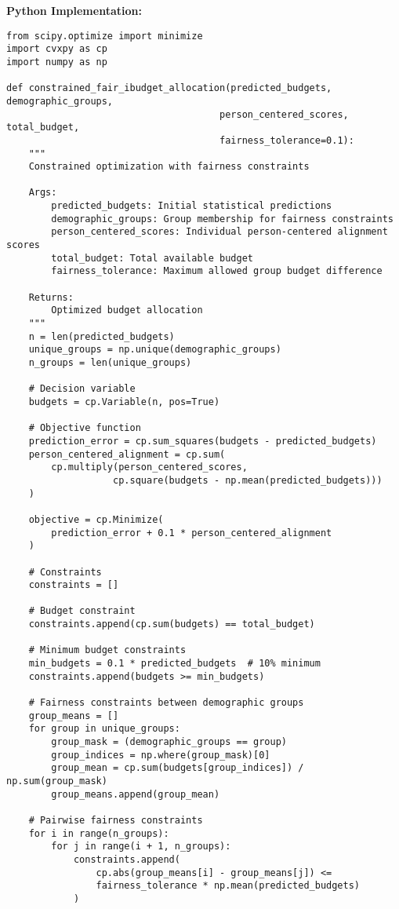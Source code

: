 \textbf{Python Implementation:}
\begin{lstlisting}
from scipy.optimize import minimize
import cvxpy as cp
import numpy as np

def constrained_fair_ibudget_allocation(predicted_budgets, demographic_groups, 
                                      person_centered_scores, total_budget,
                                      fairness_tolerance=0.1):
    """
    Constrained optimization with fairness constraints
    
    Args:
        predicted_budgets: Initial statistical predictions
        demographic_groups: Group membership for fairness constraints
        person_centered_scores: Individual person-centered alignment scores
        total_budget: Total available budget
        fairness_tolerance: Maximum allowed group budget difference
    
    Returns:
        Optimized budget allocation
    """
    n = len(predicted_budgets)
    unique_groups = np.unique(demographic_groups)
    n_groups = len(unique_groups)
    
    # Decision variable
    budgets = cp.Variable(n, pos=True)
    
    # Objective function
    prediction_error = cp.sum_squares(budgets - predicted_budgets)
    person_centered_alignment = cp.sum(
        cp.multiply(person_centered_scores, 
                   cp.square(budgets - np.mean(predicted_budgets)))
    )
    
    objective = cp.Minimize(
        prediction_error + 0.1 * person_centered_alignment
    )
    
    # Constraints
    constraints = []
    
    # Budget constraint
    constraints.append(cp.sum(budgets) == total_budget)
    
    # Minimum budget constraints
    min_budgets = 0.1 * predicted_budgets  # 10% minimum
    constraints.append(budgets >= min_budgets)
    
    # Fairness constraints between demographic groups
    group_means = []
    for group in unique_groups:
        group_mask = (demographic_groups == group)
        group_indices = np.where(group_mask)[0]
        group_mean = cp.sum(budgets[group_indices]) / np.sum(group_mask)
        group_means.append(group_mean)
    
    # Pairwise fairness constraints
    for i in range(n_groups):
        for j in range(i + 1, n_groups):
            constraints.append(
                cp.abs(group_means[i] - group_means[j]) <= 
                fairness_tolerance * np.mean(predicted_budgets)
            )
    

\end{lstlisting}
